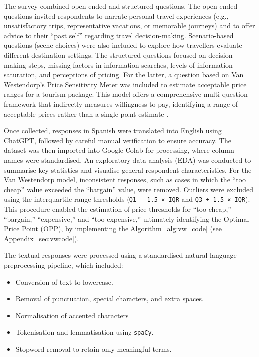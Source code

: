 \documentclass[a4paper, 12pt, twoside]{report}  %
\begin{document}
\indent The survey combined open-ended and structured questions. The open-ended questions invited respondents to narrate personal travel experiences (e.g., unsatisfactory trips, representative vacations, or memorable journeys) and to offer advice to their “past self” regarding travel decision-making. Scenario-based questions (scene choices) were also included to explore how travellers evaluate different destination settings. The structured questions focused on decision-making steps, missing factors in information searches, levels of information saturation, and perceptions of pricing. For the latter, a question based on Van Westendorp’s Price Sensitivity Meter was included to estimate acceptable price ranges for a tourism package. This model offers a comprehensive multi-question framework that indirectly measures willingness to pay, identifying a range of acceptable prices rather than a single point estimate \cite{vw_model}.

\indent Once collected, responses in Spanish were translated into English using ChatGPT, followed by careful manual verification to ensure accuracy. The dataset was then imported into Google Colab for processing, where column names were standardised. An exploratory data analysis (EDA) was conducted to summarise key statistics and visualise general respondent characteristics. For the Van Westendorp model, inconsistent responses, such as cases in which the “too cheap” value exceeded the “bargain” value, were removed. Outliers were excluded using the interquartile range thresholds (\texttt{Q1 - 1.5 × IQR} and \texttt{Q3 + 1.5 × IQR}). This procedure enabled the estimation of price thresholds for “too cheap,” “bargain,” “expensive,” and “too expensive,” ultimately identifying the Optimal Price Point (OPP), by implementing the Algorithm~\ref{alg:vw_code} (see Appendix~\ref{sec:vwcode}).

\indent The textual responses were processed using a standardised natural language preprocessing pipeline, which included:

\begin{itemize}
    \item Conversion of text to lowercase.
    \item Removal of punctuation, special characters, and extra spaces.
    \item Normalisation of accented characters.
    \item Tokenisation and lemmatisation using \texttt{spaCy}.
    \item Stopword removal to retain only meaningful terms.
\end{itemize}
\end{document}
